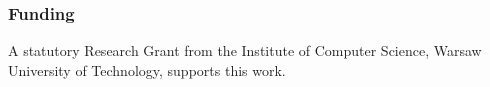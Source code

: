 \documentclass[pdflatex,sn-vancouver-num]{sn-jnl}%
\begin{document}
\subsubsection*{Funding}

A statutory Research Grant from the Institute of Computer Science, Warsaw University of Technology, supports this work.




    \backmatter


    
\end{document}
